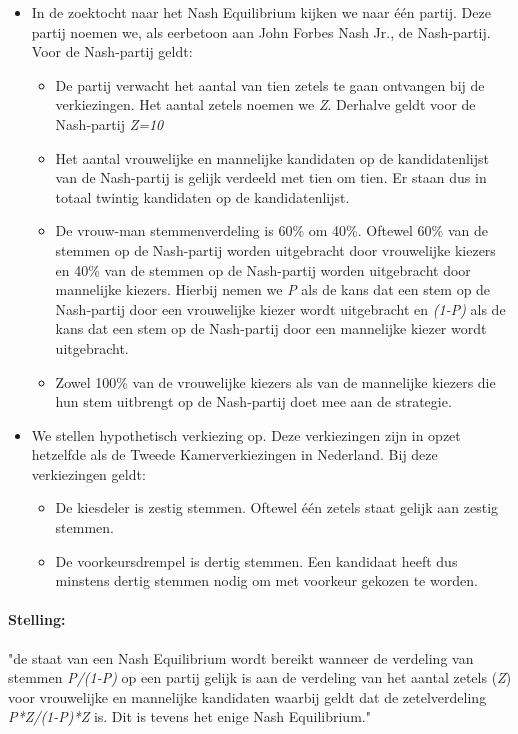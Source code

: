 \begin{itemize}
	\item
In de zoektocht naar het Nash Equilibrium kijken we naar één partij. Deze partij noemen we, als eerbetoon aan John Forbes Nash Jr., de Nash-partij. Voor de Nash-partij geldt:
		\begin{itemize}
			\item
			De partij verwacht het aantal van tien zetels te gaan ontvangen bij de verkiezingen. Het aantal zetels noemen we \textit{Z}. Derhalve geldt voor de Nash-partij \textit{Z=10}
			\item
			Het aantal vrouwelijke en mannelijke kandidaten op de kandidatenlijst van de Nash-partij is gelijk verdeeld met tien om tien. Er staan dus in totaal twintig kandidaten op de kandidatenlijst. 
			\item
			De vrouw-man stemmenverdeling is 60\% om 40\%. Oftewel 60\% van de stemmen op de Nash-partij worden uitgebracht door vrouwelijke kiezers en 40\% van de stemmen op de Nash-partij worden uitgebracht door mannelijke kiezers. Hierbij nemen we \textit{P} als de kans dat een stem op de Nash-partij door een vrouwelijke kiezer wordt uitgebracht en \textit{(1-P)} als de kans dat een stem op de Nash-partij door een mannelijke kiezer wordt uitgebracht.  
			\item
			Zowel 100\% van de vrouwelijke kiezers als van de mannelijke kiezers die hun stem uitbrengt op de Nash-partij doet mee aan de strategie.
		\end{itemize}
	\item
We stellen hypothetisch verkiezing op. Deze verkiezingen zijn in opzet hetzelfde als de Tweede Kamerverkiezingen in Nederland. Bij deze verkiezingen geldt:
		\begin{itemize}
			\item 
		De kiesdeler is zestig stemmen. Oftewel één zetels staat gelijk aan zestig stemmen.
		\item
		De voorkeursdrempel is dertig stemmen. Een kandidaat heeft dus minstens dertig stemmen nodig om met voorkeur gekozen te worden.
		\end{itemize}
\end{itemize}

\paragraph{Stelling:} "de staat van een Nash Equilibrium wordt bereikt wanneer de verdeling van stemmen \textit{P/(1-P)} op een partij gelijk is aan de verdeling van het aantal zetels (\textit{Z}) voor vrouwelijke en mannelijke kandidaten waarbij geldt dat de zetelverdeling \textit{P*Z/(1-P)*Z} is. Dit is tevens het enige Nash Equilibrium." \\

